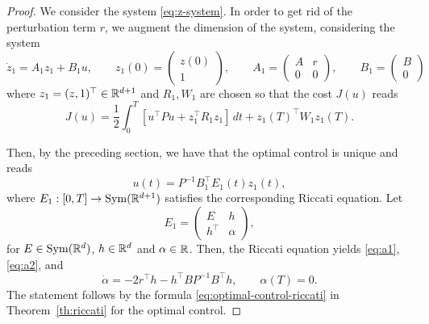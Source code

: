 \begin{proof}
    We consider the system \eqref{eq:z-system}.
    In order to get rid of the perturbation term $r$, we augment the dimension of the system, considering the system
    \begin{equation}
        \dot z_1 = A_1z_1+B_1 u,
        \qquad
        z_1(0)=\begin{pmatrix}
            z(0) \\1
        \end{pmatrix},
        \qquad
        A_1 =
        \begin{pmatrix}
            A & r \\ 0 & 0
        \end{pmatrix},
        \qquad
        B_1 =
        \begin{pmatrix}
            B \\ 0
        \end{pmatrix}
    \end{equation}
    where $z_1 = (z,1)^\top \in \mathbb{R}^{d+1}$ and $R_1, W_1$ are chosen so that the cost $J(u)$ reads
    \begin{equation}
        J(u) = \frac{1}2\int_0^T \left[ u^\top P u + z_1^\top R_1 z_ 1 \right] \, dt + z_1(T)^\top W_1 z_1(T).
    \end{equation}

    Then, by the preceding section, we have that the optimal control is unique and reads
    \begin{equation}
        u(t) = P^{-1}B_1^\top E_1(t)z_1(t),
    \end{equation}
    where $E_1:[0,T]\to \operatorname{Sym}(\mathbb{R}^{d+1})$ satisfies the corresponding Riccati equation. 
    Let
    \begin{equation}
       E_1 = 
       \begin{pmatrix}
        E & h \\ h^\top & \alpha 
       \end{pmatrix} ,
    \end{equation}
    for $E\in \operatorname{Sym}(\mathbb{R}^d)$, $h\in \mathbb{R}^d$ and $\alpha\in \mathbb{R}$. Then, the Riccati equation yields \eqref{eq:a1}, \eqref{eq:a2}, and
    \begin{equation}
        \dot \alpha = -2r^\top h - h^\top BP^{-1}B^\top h, \qquad \alpha(T) = 0.
    \end{equation}
    The statement follows by the formula \eqref{eq:optimal-control-riccati} in Theorem~\ref{th:riccati} for the optimal control.
\end{proof}